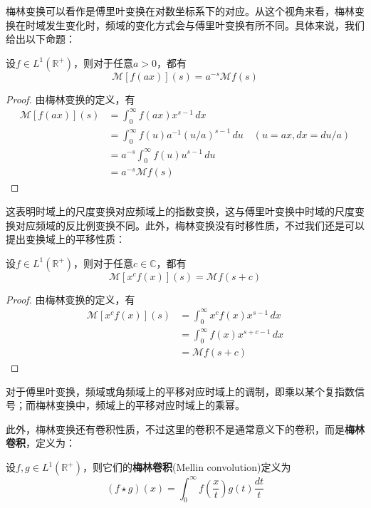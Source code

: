梅林变换可以看作是傅里叶变换在对数坐标系下的对应。从这个视角来看，梅林变换在时域发生变化时，频域的变化方式会与傅里叶变换有所不同。具体来说，我们给出以下命题：
\begin{proposition}[梅林变换的尺度变换性质]
    设$f\in L^1(\mathbb{R}^+)$，则对于任意$a>0$，都有
    \[\mathcal{M} [f(ax)](s)=a^{-s}\mathcal{M} f(s)\]
\end{proposition}
\begin{proof}
    由梅林变换的定义，有
    \begin{align*}
        \mathcal{M} [f(ax)](s)&=\int_0^{\infty}f(ax)x^{s-1}\,dx\\
        &=\int_0^{\infty}f(u)a^{-1}(u/a)^{s-1}\,du\quad (u=ax,dx=du/a)\\
        &=a^{-s}\int_0^{\infty}f(u)u^{s-1}\,du\\
        &=a^{-s}\mathcal{M} f(s)
    \end{align*}
\end{proof}

这表明时域上的尺度变换对应频域上的指数变换，这与傅里叶变换中时域的尺度变换对应频域的反比例变换不同。此外，梅林变换没有时移性质，不过我们还是可以提出变换域上的平移性质：

\begin{proposition}[梅林变换的乘幂性质]
    设$f\in L^1(\mathbb{R}^+)$，则对于任意$c\in\mathbb{C}$，都有
    \[\mathcal{M} [x^c f(x)](s)=\mathcal{M} f(s+c)\]
\end{proposition}
\begin{proof}
    由梅林变换的定义，有
    \begin{align*}
        \mathcal{M} [x^c f(x)](s)&=\int_0^{\infty}x^c f(x)x^{s-1}\,dx\\
        &=\int_0^{\infty}f(x)x^{s+c-1}\,dx\\
        &=\mathcal{M} f(s+c)
    \end{align*}
\end{proof}

对于傅里叶变换，频域或角频域上的平移对应时域上的调制，即乘以某个复指数信号；而梅林变换中，频域上的平移对应时域上的乘幂。

此外，梅林变换还有卷积性质，不过这里的卷积不是通常意义下的卷积，而是\textbf{梅林卷积}，定义为：
\begin{definition}[梅林卷积]
    设$f,g\in L^1(\mathbb{R}^+)$，则它们的\textbf{梅林卷积}(Mellin convolution)定义为
    \[(f\star g)(x)=\int_0^{\infty}f\left(\frac{x}{t}\right)g(t)\frac{dt}{t}\]
\end{definition}

